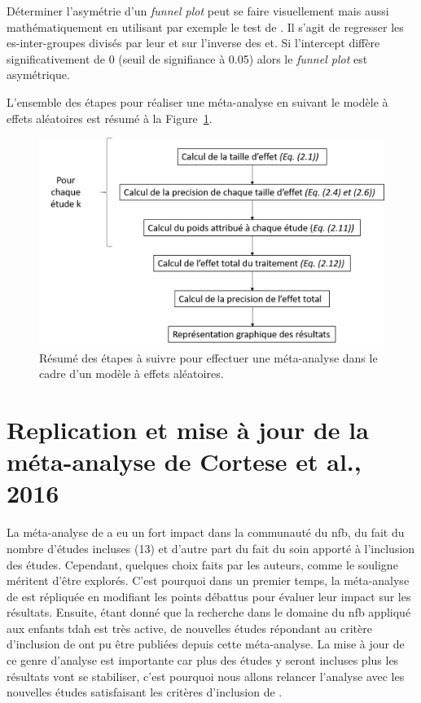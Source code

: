 Déterminer l'asymétrie d'un \textit{funnel plot} peut se faire visuellement mais aussi mathématiquement en utilisant par exemple le test de \citet{Egger1997}. 
Il s'agit de regresser les \gls{es}-inter-groupes divisés par leur \gls{et} sur l'inverse des \gls{et}. Si l'intercept diffère significativement de 
0 (seuil de signifiance à 0.05) alors le \textit{funnel plot} est asymétrique.

L'ensemble des étapes pour réaliser une méta-analyse en suivant le modèle à effets aléatoires est résumé à la Figure~\ref{Figure:pipeline_meta_analyse}.

\begin{figure}[h!]
  \centering
	\includegraphics[width=1.0\linewidth]{figures/chapter-2/pipeline-perform-meta-analysis} 
  \caption{Résumé des étapes à suivre pour effectuer une méta-analyse dans le cadre d'un modèle à effets aléatoires.}
  \label{Figure:pipeline_meta_analyse}
\end{figure}

\section{Replication et mise à jour de la méta-analyse de Cortese et al., 2016} \label{replication_and_update}

La méta-analyse de \citet{Cortese2016} a eu un fort impact dans la communauté du \gls{nfb}, du fait du nombre d'études incluses (13) et d'autre part
du fait du soin apporté à l'inclusion des études. Cependant, quelques choix faits par les auteurs, comme le souligne \citet{Micoulaud2016} méritent d'être explorés.
C'est pourquoi dans un premier temps, la méta-analyse de \citet{Cortese2016} est répliquée en modifiant les points débattus pour évaluer leur impact sur les
résultats. Ensuite, étant donné que la recherche dans le domaine du \gls{nfb} appliqué aux enfants \gls{tdah} est très active, de nouvelles études répondant au 
critère d'inclusion de \citet{Cortese2016} ont pu être publiées depuis cette méta-analyse. La mise à jour de ce genre d'analyse est importante
car plus des études y seront incluses plus les résultats vont se stabiliser, c'est pourquoi nous allons relancer l'analyse avec les nouvelles études
satisfaisant les critères d'inclusion de \citet{Cortese2016}.

